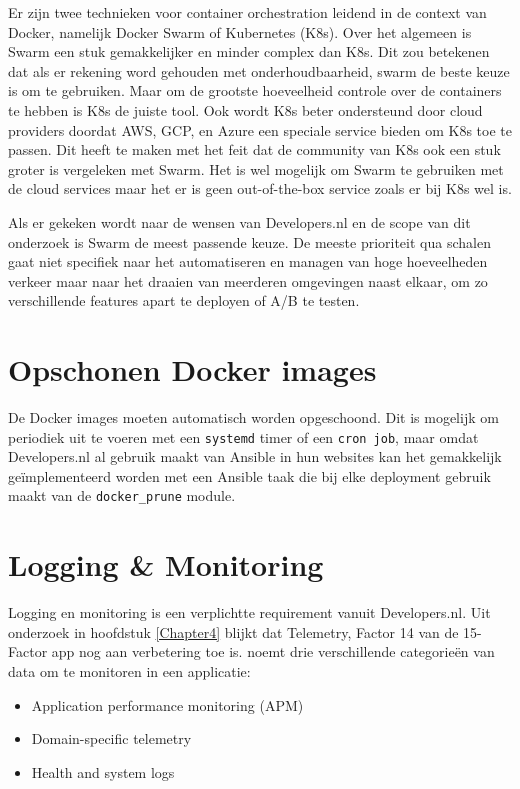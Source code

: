 Er zijn twee technieken voor container orchestration leidend in de context van Docker, namelijk Docker Swarm of Kubernetes (K8s). Over het algemeen is Swarm een stuk gemakkelijker en minder complex dan K8s. Dit zou betekenen dat als er rekening word gehouden met onderhoudbaarheid, swarm de beste keuze is om te gebruiken. Maar om de grootste hoeveelheid controle over de containers te hebben is K8s de juiste tool. Ook wordt K8s beter ondersteund door cloud providers doordat AWS, GCP, en Azure een speciale service bieden om K8s toe te passen. Dit heeft te maken met het feit dat de community van K8s ook een stuk groter is vergeleken met Swarm. Het is wel mogelijk om Swarm te gebruiken met de cloud services maar het er is geen out-of-the-box service zoals er bij K8s wel is. 

Als er gekeken wordt naar de wensen van Developers.nl en de scope van dit onderzoek is Swarm de meest passende keuze. De meeste prioriteit qua schalen gaat niet specifiek naar het automatiseren en managen van hoge hoeveelheden verkeer maar naar het draaien van meerderen omgevingen naast elkaar, om zo verschillende features apart te deployen of A/B te testen.

\section{Opschonen Docker images}
De Docker images moeten automatisch worden opgeschoond. Dit is mogelijk om periodiek uit te voeren met een \texttt{systemd} timer of een \texttt{cron job}, maar omdat Developers.nl al gebruik maakt van Ansible in hun websites kan het gemakkelijk geïmplementeerd worden met een Ansible taak die bij elke deployment gebruik maakt van de \texttt{docker\_prune} module.

\section{Logging \& Monitoring}
Logging en monitoring is een verplichtte requirement vanuit Developers.nl. Uit onderzoek in hoofdstuk \ref{Chapter4} blijkt dat Telemetry, Factor 14 van de 15-Factor app nog aan verbetering toe is. \parencite{Beyond12Factor} noemt drie verschillende categorieën van data om te monitoren in een applicatie:
\begin{itemize}
	\item Application performance monitoring (APM)
	\item Domain-specific telemetry
	\item Health and system logs
\end{itemize}

